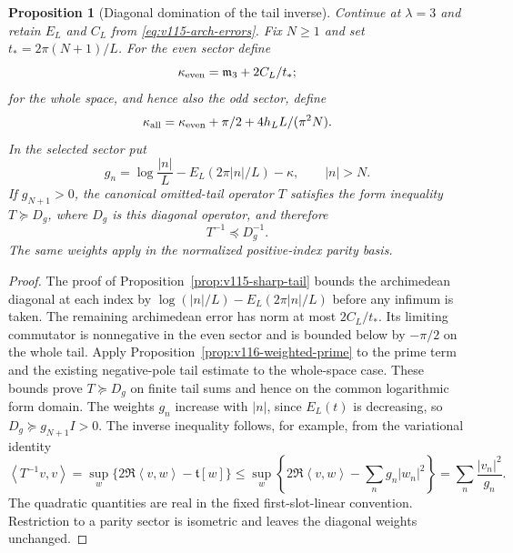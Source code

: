 \documentclass[11pt]{article}
\newtheorem{proposition}[theorem]{Proposition}
\theoremstyle{remark}
\newcommand{\ip}[2]{\left\langle #1,#2\right\rangle}
\begin{document}
\begin{proposition}[Diagonal domination of the tail inverse]
\label{prop:v116-diagonal-inverse}
Continue at $\lambda=3$ and retain $E_L$ and $C_L$ from
\eqref{eq:v115-arch-errors}. Fix $N\ge1$ and set
$t_*=2\pi(N+1)/L$. For the even sector define
\[
 \kappa_{\rm even}=\mathfrak m_3+2C_L/t_*;
\]
for the whole space, and hence also the odd sector, define
\[
 \kappa_{\rm all}=\kappa_{\rm even}+\pi/2
                         +4h_LL/(\pi^2N).
\]
In the selected sector put
\begin{equation}\label{eq:v116-diagonal-weight}
 g_n=\log\frac{|n|}{L}-E_L(2\pi|n|/L)-\kappa,
            \qquad |n|>N.
\end{equation}
If $g_{N+1}>0$, the canonical omitted-tail operator $T$ satisfies
the form inequality $T\succeq D_g$, where $D_g$ is this diagonal
operator, and therefore
\begin{equation}\label{eq:v116-inverse-order}
 T^{-1}\preceq D_g^{-1}.
\end{equation}
The same weights apply in the normalized positive-index parity basis.
\end{proposition}
\begin{proof}
The proof of Proposition~\ref{prop:v115-sharp-tail} bounds the
archimedean diagonal at each index by
$\log(|n|/L)-E_L(2\pi|n|/L)$ before any infimum is taken.
The remaining archimedean error has norm at most $2C_L/t_*$.
Its limiting commutator is nonnegative in the even sector and is
bounded below by $-\pi/2$ on the whole tail. Apply
Proposition~\ref{prop:v116-weighted-prime} to the prime term and the
existing negative-pole tail estimate to the whole-space case.
These bounds prove $T\succeq D_g$ on finite tail sums and hence on
the common logarithmic form domain. The weights $g_n$ increase with
$|n|$, since $E_L(t)$ is decreasing, so $D_g\succeq g_{N+1}I>0$.
The inverse inequality follows, for example, from the variational
identity
\[
 \ip{T^{-1}v}{v}
 =\sup_w\{2\Re\ip vw-\mathfrak t[w]\}
 \le\sup_w\left\{2\Re\ip vw-\sum_n g_n|w_n|^2\right\}
 =\sum_n\frac{|v_n|^2}{g_n}.
\]
The quadratic quantities are real in the fixed first-slot-linear
convention. Restriction to a parity sector is isometric and leaves
the diagonal weights unchanged.
\end{proof}
\end{document}
